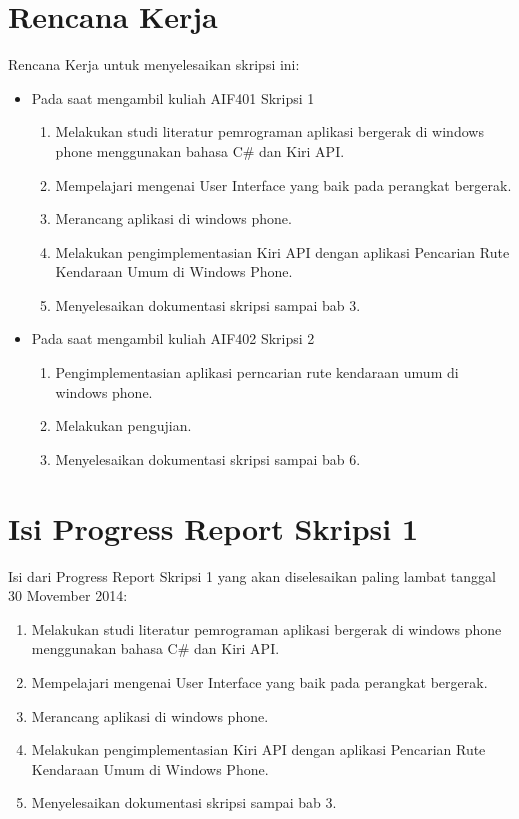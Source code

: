 \documentclass[a4paper,twoside]{article}
\begin{document}
\section{Rencana Kerja}
	Rencana Kerja untuk menyelesaikan skripsi ini:
	\begin{itemize}
		\item Pada saat mengambil kuliah AIF401 Skripsi 1
		\begin{enumerate}
			\item Melakukan studi literatur pemrograman aplikasi bergerak di windows phone menggunakan bahasa C\# dan Kiri API.
			\item Mempelajari mengenai User Interface yang baik pada perangkat bergerak.
			\item Merancang aplikasi di windows phone.			
			\item Melakukan pengimplementasian Kiri API dengan aplikasi Pencarian Rute Kendaraan Umum di Windows Phone.
			\item Menyelesaikan dokumentasi skripsi sampai bab 3.
		\end{enumerate}
	\end{itemize}
	\begin{itemize}
		\item Pada saat mengambil kuliah AIF402 Skripsi 2
		\begin{enumerate}
			\item Pengimplementasian aplikasi perncarian rute kendaraan umum di windows phone.
			\item Melakukan pengujian.
			\item Menyelesaikan dokumentasi skripsi sampai bab 6.
		\end{enumerate}
	\end{itemize}
	
\section{Isi Progress Report Skripsi 1}
Isi dari Progress Report Skripsi 1 yang akan diselesaikan paling lambat tanggal 30 Movember 2014:
\begin{enumerate}
	\item Melakukan studi literatur pemrograman aplikasi bergerak di windows phone menggunakan bahasa C\# dan Kiri API.
	\item Mempelajari mengenai User Interface yang baik pada perangkat bergerak.
	\item Merancang aplikasi di windows phone.			
	\item Melakukan pengimplementasian Kiri API dengan aplikasi Pencarian Rute Kendaraan Umum di Windows Phone.
	\item Menyelesaikan dokumentasi skripsi sampai bab 3.
\end{enumerate}	
\end{document}
